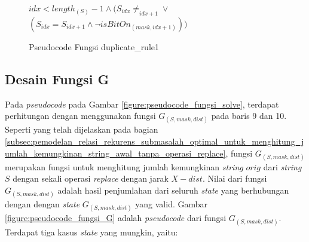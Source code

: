 \begin{figure}[H]
	\begin{mdframed}
		\begin{codebox}
			\li \Return $ idx < length_{(S)}-1 \land (S_{idx} \neq _{idx+1} \lor$\\$ (S_{idx} = S_{idx+1} \land \neg isBitOn_{(mask, idx+1)})) $						
		\end{codebox}
	\end{mdframed}
	\caption{Pseudocode Fungsi duplicate\_rule1}
	\label{figure:pseudocode_fungsi_duplicate_rule1}
\end{figure}

\subsection{Desain Fungsi G}
\label{subsec:desain_fungsi_g}

Pada \textit{pseudocode} pada Gambar \ref{figure:pseudocode_fungsi_solve}, terdapat perhitungan dengan menggunakan fungsi $G_{(S, mask, dist)}$ pada baris 9 dan 10. Seperti yang telah dijelaskan pada bagian \ref{subsec:pemodelan_relasi_rekurens_submasalah_optimal_untuk_menghitung_jumlah_kemungkinan_string_awal_tanpa_operasi_replace}, fungsi $G_{(S, mask, dist)}$ merupakan fungsi untuk menghitung jumlah kemungkinan \textit{string} $orig$ dari \textit{string} $S$ dengan sekali operasi \textit{replace} dengan jarak $X-dist$. Nilai dari fungsi $G_{(S, mask, dist)}$ adalah hasil penjumlahan dari seluruh \textit{state} yang berhubungan dengan dengan \textit{state} $G_{(S, mask, dist)}$ yang valid. Gambar \ref{figure:pseudocode_fungsi_G} adalah \textit{pseudocode} dari fungsi $G_{(S, mask, dist)}$. Terdapat tiga kasus \textit{state} yang mungkin, yaitu:

